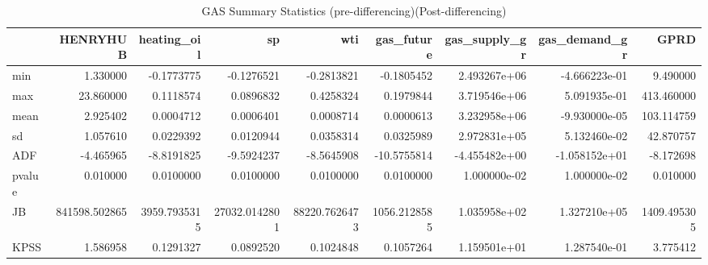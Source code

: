 \begin{table}
\centering
\caption{GAS Summary Statistics (pre-differencing)(Post-differencing)}
\centering
\begin{tabular}[t]{l|r|r|r|r|r|r|r|r}
\hline
  & HENRYHUB & heating\_oil & sp & wti & gas\_future & gas\_supply\_gr & gas\_demand\_gr & GPRD\\
\hline
min & 1.330000 & -0.1773775 & -0.1276521 & -0.2813821 & -0.1805452 & 2.493267e+06 & -4.666223e-01 & 9.490000\\
\hline
max & 23.860000 & 0.1118574 & 0.0896832 & 0.4258324 & 0.1979844 & 3.719546e+06 & 5.091935e-01 & 413.460000\\
\hline
mean & 2.925402 & 0.0004712 & 0.0006401 & 0.0008714 & 0.0000613 & 3.232958e+06 & -9.930000e-05 & 103.114759\\
\hline
sd & 1.057610 & 0.0229392 & 0.0120944 & 0.0358314 & 0.0325989 & 2.972831e+05 & 5.132460e-02 & 42.870757\\
\hline
ADF & -4.465965 & -8.8191825 & -9.5924237 & -8.5645908 & -10.5755814 & -4.455482e+00 & -1.058152e+01 & -8.172698\\
\hline
pvalue & 0.010000 & 0.0100000 & 0.0100000 & 0.0100000 & 0.0100000 & 1.000000e-02 & 1.000000e-02 & 0.010000\\
\hline
JB & 841598.502865 & 3959.7935315 & 27032.0142801 & 88220.7626473 & 1056.2128585 & 1.035958e+02 & 1.327210e+05 & 1409.495305\\
\hline
KPSS & 1.586958 & 0.1291327 & 0.0892520 & 0.1024848 & 0.1057264 & 1.159501e+01 & 1.287540e-01 & 3.775412\\
\hline
\end{tabular}
\end{table}
